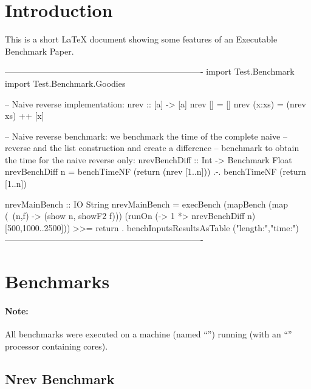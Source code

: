 \documentclass{article}
\begin{document}
\sloppy

\section{Introduction}

This is a short LaTeX document showing some features of an
Executable Benchmark Paper.

\begin{curryprog}
----------------------------------------------------------------------
import Test.Benchmark
import Test.Benchmark.Goodies

-- Naive reverse implementation:
nrev :: [a] -> [a]
nrev []     = []
nrev (x:xs) = (nrev xs) ++ [x]

-- Naive reverse benchmark: we benchmark the time of the complete naive
-- reverse and the list construction and create a difference
-- benchmark to obtain the time for the naive reverse only:
nrevBenchDiff :: Int -> Benchmark Float
nrevBenchDiff n =
  benchTimeNF (return (nrev [1..n]))  .-.  benchTimeNF (return [1..n])

nrevMainBench :: IO String
nrevMainBench =
  execBench (mapBench (map (\ (n,f) -> (show n, showF2 f)))
               (runOn (\n -> 1 *> nrevBenchDiff n) [500,1000..2500])) >>=
    return . benchInputsResultsAsTable ("length:","time:")
----------------------------------------------------------------------
\end{curryprog}

\section{Benchmarks}

\paragraph{Note:}
%
All benchmarks were executed on a  machine
(named ``'')
running  
(with an ``'' processor containing
 cores).

\subsection{Nrev Benchmark}

\begin{center}
\end{center}
\end{document}
